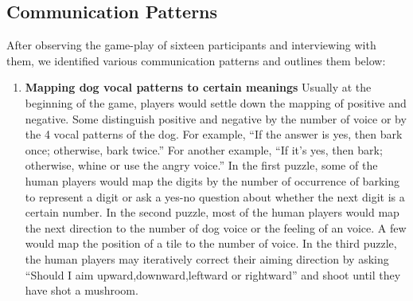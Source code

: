 \documentclass{sigchi}
\begin{document}
\subsection{Communication Patterns}
After observing the game-play of sixteen participants and interviewing with them, we identified various communication patterns and outlines them below:
\begin{enumerate}
\item \textbf{Mapping dog vocal patterns to certain meanings}\newline
Usually at the beginning of the game, players would settle down the mapping of positive and negative.
Some distinguish positive and negative by the number of voice or by the 4 vocal patterns of the dog.
For example, ``If the answer is yes, then bark once; otherwise, bark twice.''
For another example, ``If it's yes, then bark; otherwise, whine or use the angry voice.''
In the first puzzle, some of the human players would map the digits by the number of occurrence of barking to represent a digit or ask a yes-no question about whether the next digit is a certain number.
In the second puzzle, most of the human players would map the next direction to the number of dog voice or the feeling of an voice.
A few would map the position of a tile to the number of voice.
In the third puzzle, the human players may iteratively correct their aiming direction by asking ``Should I aim upward,downward,leftward or rightward'' and shoot until they have shot a mushroom.


\end{enumerate}
\end{document}
